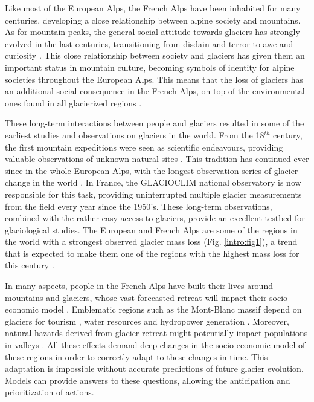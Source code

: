 Like most of the European Alps, the French Alps have been inhabited for many centuries, developing a close relationship between alpine society and mountains. As for mountain peaks, the general social attitude towards glaciers has strongly evolved in the last centuries, transitioning from disdain and terror to awe and curiosity \citep{zryd_les_2008}. This close relationship between society and glaciers has given them an important status in mountain culture, becoming symbols of identity for alpine societies throughout the European Alps. This means that the loss of glaciers has an additional social consequence in the French Alps, on top of the environmental ones found in all glacierized regions \citep{smit_exploring_2019}. 

These long-term interactions between people and glaciers resulted in some of the earliest studies and observations on glaciers in the world. From the 18$^{th}$ century, the first mountain expeditions were seen as scientific endeavours, providing valuable observations of unknown natural sites \citep{richalet_scientific_2001}. This tradition has continued ever since in the whole European Alps, with the longest observation series of glacier change in the world \citep{glamos_swiss_2019}. In France, the GLACIOCLIM national observatory is now responsible for this task, providing uninterrupted multiple glacier measurements from the field every year since the 1950's. These long-term observations, combined with the rather easy access to glaciers, provide an excellent testbed for glaciological studies. The European and French Alps are some of the regions in the world with a strongest observed glacier mass loss (Fig. \ref{intro:fig1}), a trend that is expected to make them one of the regions with the highest mass loss for this century \citep{marzeion_partitioning_2020}.

In many aspects, people in the French Alps have built their lives around mountains and glaciers, whose vast forecasted retreat will impact their socio-economic model \citep{mourey_evolution_2017, spandre_winter_2019}. Emblematic regions such as the Mont-Blanc massif depend on glaciers for tourism \citep{schut_sport_2013, spandre_climate_2019}, water resources and hydropower generation  \citep{laurent_impact_2020}. Moreover, natural hazards derived from glacier retreat might potentially impact populations in valleys \citep{magnin_estimating_2020}. All these effects demand deep changes in the socio-economic model of these regions in order to correctly adapt to these changes in time. This adaptation is impossible without accurate predictions of future glacier evolution. Models can provide answers to these questions, allowing the anticipation and prioritization of actions.

